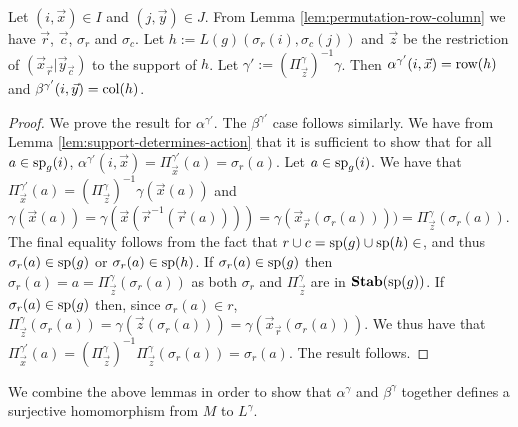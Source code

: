 \documentclass[../paper.tex]{subfiles}
\begin{document}
\begin{lem}
  \label{lem:defining-h-from-IJ}
  Let $(i, \vec{x}) \in I$ and $(j, \vec{y}) \in J$. From Lemma
  \ref{lem:permutation-row-column} we have $\vec{r}$, $\vec{c}$, $\sigma_r$ and
  $\sigma_c$. Let $h := L(g) (\sigma_r (i), \sigma_c (j))$ and $\vec{z}$ be the
  restriction of $(\vec{x}_{\vec{r}} \vert \vec{y}_{\vec{c}})$ to the support of
  $h$. Let $\gamma' := (\Pi^{\gamma}_{\vec{z}})^{-1} \gamma$. Then
  $\alpha^{\gamma'} (i, \vec{x}) = \text{row} (h)$ and $\beta^{\gamma'} (i,\vec{y}) =
  \text{col}(h)$.
\end{lem}
\begin{proof}
  We prove the result for $\alpha^{\gamma'}$. The $\beta^{\gamma'}$ case follows
  similarly. We have from Lemma \ref{lem:support-determines-action} that it is
  sufficient to show that for all $a \in \text{sp}_g(i)$, $\alpha^{\gamma'}(i,
  \vec{x}) = \Pi^{\gamma'}_{\vec{x}} (a) = \sigma_r (a)$. Let $a \in
  \text{sp}_g(i)$. We have that $\Pi^{\gamma'}_{\vec{x}} (a) =
  (\Pi^{\gamma}_{\vec{z}})^{-1} \gamma (\vec{x} (a))$ and $\gamma (\vec{x}(a)) =
  \gamma (\vec{x} (\vec{r}^{-1}(\vec{r}(a)))) = \gamma (\vec{x}_{\vec{r}}
  (\sigma_r(a)))) = \Pi^{\gamma}_{\vec{z}}(\sigma_r(a))$. The final equality
  follows from the fact that $r \cup c = \text{sp}(g) \cup \text{sp}(h)\in $, and thus
  $\sigma_r(a) \in \text{sp}(g)$ or $\sigma_r(a) \in \text{sp}(h)$. If $\sigma_r(a)
  \in \text{sp}(g)$ then $\sigma_r(a) = a = \Pi^{\gamma}_{\vec{z}}(\sigma_r(a))$ as
  both $\sigma_r$ and $\Pi^{\gamma}_{\vec{z}}$ are in $\text{\textbf{Stab}} (\text{sp} (g))$. If
  $\sigma_r(a) \in \text{sp}(g)$ then, since $\sigma_r(a) \in r$,
  $\Pi^{\gamma}_{\vec{z}}(\sigma_r(a)) = \gamma(\vec{z}(\sigma_r(a))) =
  \gamma(\vec{x}_{\vec{r}}(\sigma_r(a)))$. We thus have that
  $\Pi^{\gamma'}_{\vec{x}}(a) =
  (\Pi^{\gamma}_{\vec{z}})^{-1}\Pi^{\gamma}_{\vec{z}} (\sigma_r(a)) =
  \sigma_r(a)$. The result follows.
\end{proof}

We combine the above lemmas in order to show that $\alpha^{\gamma}$ and
$\beta^{\gamma}$ together defines a surjective homomorphism from $M$ to
$L^{\gamma}$.
\end{document}

